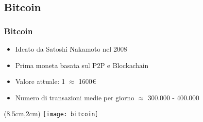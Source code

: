 \subsection{Bitcoin}
\begin{frame}
 \frametitle{Bitcoin}

 \begin{itemize}
  \item<1-> Ideato da Satoshi Nakamoto nel 2008
  \item<2-> Prima moneta basata sul P2P e Blockachain%
  \item<3-> Valore attuale: 1\bitcoin{} $ \approx $  1600\euro{}
  \item<4-> Numero di transazioni medie per giorno $ \approx $ 300.000 - 400.000
 \end{itemize}



 \begin{textblock*}{5cm}(8.5cm,2cm)
  \texttt{[image: bitcoin]}
 \end{textblock*}

\end{frame}
